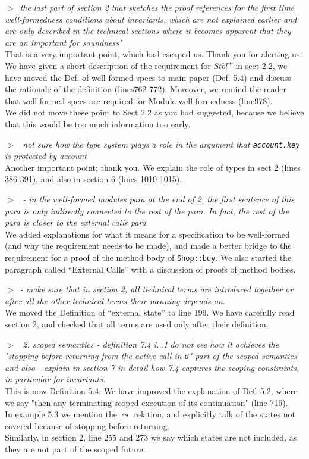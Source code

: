 \documentclass{article}
\newcommand{\pair}[2]{\noindent $>$\  \emph{#1}   \\ {#2}\\ \vspace{.1pt}}
\begin{document}
\pair{the last part of section 2 that sketches the proof references for the first time well-formedness conditions about invariants, which are not explained earlier and are only described in the technical sections where it becomes apparent that they are an important for soundness"}
{
That is a very important point, which had escaped us. Thank you for alerting us. We have  given a short description of the requirement for $Stbl^+$ in sect 2.2, we have moved the Def. of well-formed specs to main paper (Def. 5.4) and discuss the rationale of the definition (lines762-772). Moreover, we remind the reader that well-formed specs are required for Module well-formedness (line978). \\
We did not move these point to Sect 2.2 as you had suggested, because we believe that this would be too much information too early.}

\pair{ not sure how the type system plays a role in the argument that \texttt{account.key} is protected by account }
{Another important point; thank you. We explain the role of types in sect 2 (lines 386-391), and also in section 6 (lines 1010-1015).}

\pair{ - in the well-formed modules para at the end of 2, the first sentence of this para is only indirectly connected to the rest of the para. In fact, the rest of the para is closer to the external calls para}
{We added explanations for what it means for a specification to be well-formed (and why the requirement needs to be made), and made a better bridge to the requirement for a proof of the method body of  \texttt{Shop::buy}. We also started the paragraph called “External Calls” with a discussion of proofs of method bodies.}

\pair{-  make sure that in section 2, all technical terms are introduced together or after all the other technical terms their meaning depends on.}
{We moved the Definition of “external state” to line 199. We have carefully read section 2, and checked that all terms are used only after their definition. }

\pair{ 2.  scoped semantics  - definition 7.4 i...I do not see how it achieves the "stopping before returning from the active call in σ" part of the scoped semantics
and also  -  explain in section 7 in detail how 7.4 captures the scoping constraints, in particular for invariants.}
{This is now Definition 5.4. We have improved the explanation of Def. 5.2, where we say "then any terminating scoped execution of its continuation" (line 716).
\\
 In example 5.3 we mention the $\leadsto$ relation, and explicitly talk of the states not covered because of stopping before returning. 
 \\
 Similarly, in section 2, line 255 and 273 we say which states are not  included, as they are not part of the scoped future.}
 
\end{document}
